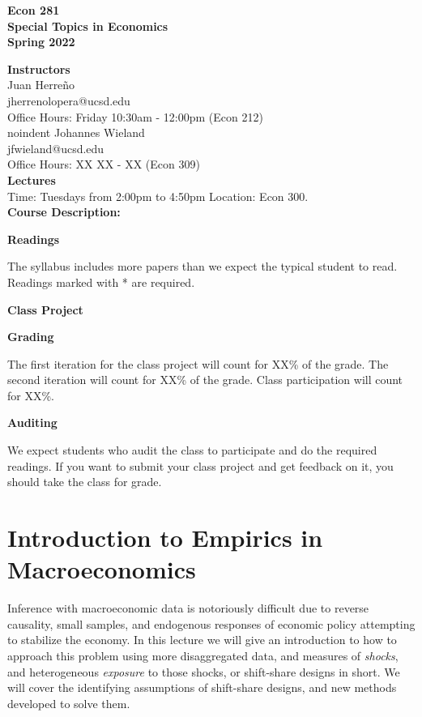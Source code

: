 \documentclass [12pt]{article}
\begin{document}
\begin{center}
\textbf{Econ 281\\
Special Topics in Economics\\
Spring 2022}
\end{center}


\noindent \textbf{Instructors} \\
Juan Herre\~no\\ 
jherrenolopera@ucsd.edu\\
Office Hours: Friday 10:30am - 12:00pm (Econ 212)\\

noindent Johannes Wieland\\ 
jfwieland@ucsd.edu\\
Office Hours: XX XX - XX  (Econ 309)\\


\noindent \textbf{Lectures} \\
Time: Tuesdays from 2:00pm to 4:50pm
Location: Econ 300.\\


\noindent \textbf{Course Description:} 



\noindent  \textbf{Readings}

\noindent The syllabus includes more papers than we expect the typical student to read. Readings marked with * are required.


\noindent  \textbf{Class Project}


\noindent  \textbf{Grading}

\noindent The first iteration for the class project will count for XX\% of the grade. The second iteration will count for XX\% of the grade. Class participation will count for XX\%.

\noindent  \textbf{Auditing}

\noindent We expect students who audit the class to participate and do the required readings. If you want to submit your class project and get feedback on it, you should take the class for grade.

\newpage

\section{Introduction to Empirics in Macroeconomics}

Inference with macroeconomic data is notoriously difficult due to reverse causality, small samples, and endogenous responses of economic policy attempting to stabilize the economy. In this lecture we will give an introduction to how to approach this problem using more disaggregated data, and measures of  \textit{shocks}, and heterogeneous \textit{exposure} to those shocks, or shift-share designs in short. We will cover the identifying assumptions of shift-share designs, and new methods developed to solve them. 
\end{document}
